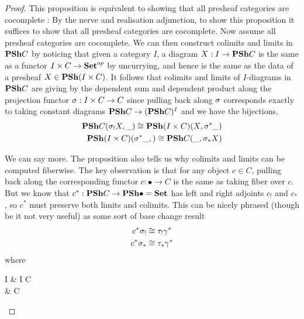 \documentclass{article}
\begin{document}
\begin{proof}
  


  This proposition is equivalent to showing that
  all presheaf categories are cocomplete : 
  By the nerve and realisation adjunction,
  to show this proposition it suffices to show that 
  all presheaf categories are cocomplete.
  Now assume all presheaf categories are cocomplete.
  We can then construct colimits and limits in $\mathbf{PSh} C$
  by noticing that given a category $I$,
  a diagram $X : I \to \mathbf{PSh} C$ is the same as 
  a functor $I \times C \to \mathbf{Set}^{op}$ by uncurrying,
  and hence is the same as the data of a presheaf $X \in \mathbf{PSh} (I \times C)$.
  It follows that colimits and limits of $I$-diagrams in $\mathbf{PSh} C$
  are giving by the dependent sum and dependent product
  along the projection functor $\sigma : I \times C \to C$ since
  pulling back along $\sigma$ corresponds exactly to 
  taking constant diagrams $\mathbf{PSh} C \to (\mathbf{PSh} C)^I$
  and we have the bijections,
  \begin{align*}
    \mathbf{PSh} C (\sigma_! X , \_ ) \cong \mathbf{PSh}(I \times C) (X , \sigma^* \_) \\
    \mathbf{PSh} (I \times C) (\sigma^* \_ , ) \cong \mathbf{PSh} C (\_ , \sigma_* X)
  \end{align*}
  
  We can say more.
  The proposition also tells us why colimits and limits can be computed
  fiberwise.
  The key observation is that for any object $c \in C$,
  pulling back along the corresponding functor $c : \bullet \to C$
  is the same as taking fiber over $c$.
  But we know that $c^* : \mathbf{PSh} C \to \mathbf{PSh} \bullet = \mathbf{Set}$
  has left and right adjoints $c_!$ and $c_*$,
  so $c^*$ must preserve both limits and colimits.
  This can be nicely phrased (though be it not very useful) as
  some sort of base change result
  \begin{align*}
    c^* \sigma_! &\cong \tau_! \gamma^* \\
    c^* \sigma_* &\cong \tau_* \gamma^*
  \end{align*}
  where
  \begin{cd}
    I & {I \times C} \\
    \bullet & C
    \arrow["\tau"', from=1-1, to=2-1]
    \arrow["\gamma", from=1-1, to=1-2]
    \arrow["c"', from=2-1, to=2-2]
    \arrow["\sigma", from=1-2, to=2-2]
    \arrow["\lrcorner"{anchor=center, pos=0.125}, draw=none, from=1-1, to=2-2]
  \end{cd}



\end{proof}
\end{document}
